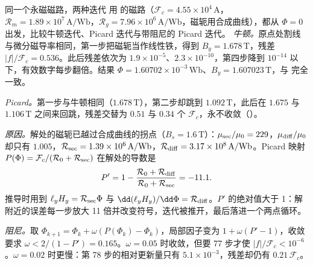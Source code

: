 \begin{example}[label=ex:femvector-picard]{同一个永磁磁路，两种迭代}
用 的磁路（$\mathcal F_c=4.55\times10^4\,\mathrm A$，$\mathcal R_m=1.89\times10^7\,\mathrm{A/Wb}$，$\mathcal R_g=7.96\times10^6\,\mathrm{A/Wb}$，磁轭用合成曲线），都从 $\Phi=0$ 出发，比较牛顿迭代、Picard 迭代与带阻尼的 Picard 迭代。
\solution
\emph{牛顿。}原点处割线与微分磁导率相同，第一步把磁轭当作线性铁，得到 $B_y=1.678\,\mathrm T$，残差 $|f|/\mathcal F_c=0.536$。此后残差依次为 $1.9\times10^{-5}$、$2.3\times10^{-10}$，第四步降到 $10^{-14}$ 以下，有效数字每步翻倍。结果 $\Phi=1.60702\times10^{-3}\,\mathrm{Wb}$、$B_y=1.607023\,\mathrm T$，与 完全一致。

\emph{Picard。}第一步与牛顿相同（$1.678\,\mathrm T$），第二步却跳到 $1.092\,\mathrm T$，此后在 $1.675$ 与 $1.106\,\mathrm T$ 之间来回跳，残差交替为 $0.51$ 与 $0.34$ 个 $\mathcal F_c$，永不收敛（）。

\emph{原因。}解处的磁轭已越过合成曲线的拐点（$B_s=1.6\,\mathrm T$）：$\mu_{\rm sec}/\mu_0=229$，$\mu_{\rm diff}/\mu_0$ 却只有 $1.005$，$\mathcal R_{\rm sec}=1.39\times10^6\,\mathrm{A/Wb}$，$\mathcal R_{\rm diff}=3.17\times10^8\,\mathrm{A/Wb}$。Picard 映射 $P(\Phi)=\mathcal F_c/(\mathcal R_0+\mathcal R_{\rm sec})$ 在解处的导数是
\begin{equation*}
P'=1-\frac{\mathcal R_0+\mathcal R_{\rm diff}}{\mathcal R_0+\mathcal R_{\rm sec}}=-11.1 .
\end{equation*}
推导时用到 $\ell_yH_y=\mathcal R_{\rm sec}\Phi$ 与 $\dd(\ell_yH_y)/\dd\Phi=\mathcal R_{\rm diff}$。$P'$ 的绝对值大于 1：解附近的误差每一步放大 11 倍并改变符号，迭代被推开，最后落进一个两点循环。

\emph{阻尼。}取 $\Phi_{k+1}=\Phi_k+\omega(P(\Phi_k)-\Phi_k)$，局部因子变为 $1+\omega(P'-1)$，收敛要求 $\omega<2/(1-P')=0.165$。$\omega=0.05$ 时收敛，但要 77 步才使 $|f|/\mathcal F_c<10^{-6}$。$\omega=0.02$ 时更慢：第 78 步的相对更新量只有 $5.1\times10^{-3}$，残差却仍有 $0.21\,\mathcal F_c$。
\end{example}


